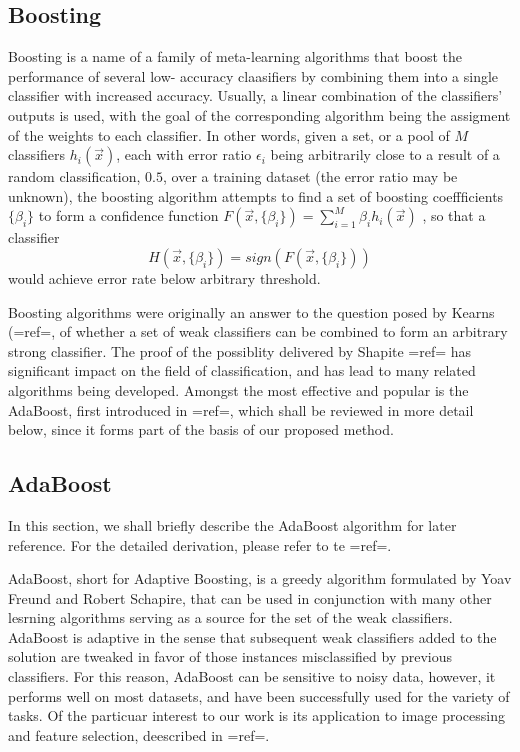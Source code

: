 \subsection{Boosting}
Boosting is a name of a family of meta-learning algorithms that boost the performance of several low- accuracy claasifiers by combining them into a single classifier with increased accuracy. Usually, a linear combination of the classifiers' outputs is used, with the goal of the corresponding algorithm being the assigment of the  weights to each classifier. In other words, given a set, or a pool of $M$ classifiers $h_i(\vec{x})$, each with error ratio $\epsilon_i$ being arbitrarily close to a result of a random classification, $0.5$,  over a training dataset (the error ratio may be unknown), the boosting algorithm attempts to find a set of boosting coeffficients $\{\beta_i\}$ to form a confidence function $F(\vec{x},\{\beta_i\})=\sum_{i=1}^{M}\beta_i h_i(\vec{x})$ , so that a classifier
\begin{equation}
\label{BoostingClassifier}
H(\vec{x},\{\beta_i\})=sign(F(\vec{x},\{\beta_i\}))
\end{equation}
would achieve error rate below arbitrary threshold.

Boosting algorithms were originally an answer to the question posed by Kearns ({{=ref=}}, of whether a set of weak classifiers can be combined to form an arbitrary strong classifier. The proof of the possiblity delivered by Shapite {{=ref=}} has significant impact on the field of classification, and has lead to many related algorithms being developed. Amongst the most effective and popular is the AdaBoost, first introduced in {{=ref=}}, which shall be reviewed in more detail below, since it forms part of the basis of our proposed method.

\subsection{AdaBoost} 

In this section, we shall briefly describe the AdaBoost algorithm for later reference. For the detailed derivation, please refer to te {{=ref=}}.

AdaBoost, short for Adaptive Boosting, is a greedy algorithm formulated by Yoav Freund and Robert Schapire, that can be used in conjunction with many other lesrning algorithms serving as a source for the set of the weak classifiers. AdaBoost is adaptive in the sense that subsequent weak classifiers added to the solution are tweaked in favor of those instances misclassified by previous classifiers. For this reason,  AdaBoost can be sensitive to noisy data, however, it performs well on most datasets, and have been successfully used for the variety of tasks.  Of the particuar interest to our work is its application to image processing and feature selection, deescribed in {{=ref=}}. 

